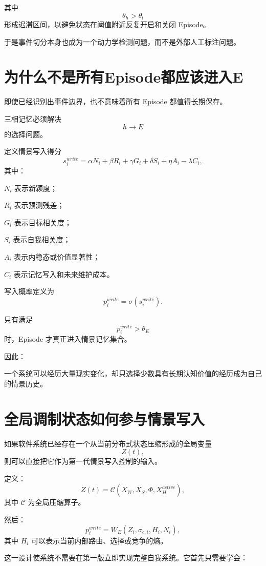 其中
\[
\theta_h>\theta_l
\]
形成迟滞区间，以避免状态在阈值附近反复开启和关闭 Episode。

于是事件切分本身也成为一个动力学检测问题，而不是外部人工标注问题。

\section{为什么不是所有Episode都应该进入E}

即使已经识别出事件边界，也不意味着所有 Episode 都值得长期保存。

三相记忆必须解决
\[
h\rightarrow E
\]
的选择问题。

定义情景写入得分
\[
s_i^{write}
=
\alpha N_i
+
\beta R_i
+
\gamma G_i
+
\delta S_i
+
\eta A_i
-
\lambda C_i,
\]
其中：

$N_i$ 表示新颖度；

$R_i$ 表示预测残差；

$G_i$ 表示目标相关度；

$S_i$ 表示自我相关度；

$A_i$ 表示内稳态或价值显著性；

$C_i$ 表示记忆写入和未来维护成本。

写入概率定义为
\[
p_i^{write}
=
\sigma
\left(
s_i^{write}
\right).
\]

只有满足
\[
p_i^{write}>\theta_E
\]
时，Episode 才真正进入情景记忆集合。

因此：
\begin{statementbox}
\centering
{}
\end{statementbox}

一个系统可以经历大量现实变化，却只选择少数具有长期认知价值的经历成为自己的情景历史。

\section{全局调制状态如何参与情景写入}

如果软件系统已经存在一个从当前分布式状态压缩形成的全局变量
\[
Z(t),
\]
则可以直接把它作为第一代情景写入控制的输入。

定义：
\[
Z(t)
=
\mathcal{C}
\left(
X_W,
X_S,
\Phi,
X_H^{active}
\right),
\]
其中 $\mathcal{C}$ 为全局压缩算子。

然后：
\[
p_i^{write}
=
W_E
\left(
Z_i,
\sigma_{c,i},
H_i,
N_i
\right),
\]
其中 $H_i$ 可以表示当前内部路由、选择或竞争的熵。

这一设计使系统不需要在第一版立即实现完整自我系统。它首先只需要学会：
\begin{statementbox}
\centering
{}
\end{statementbox}

